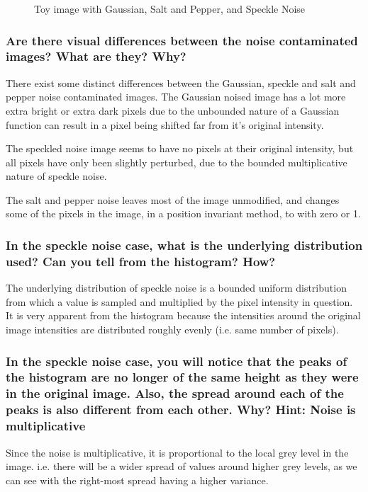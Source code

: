 \begin{figure}[htcb]
\centering
	\caption{Toy image with Gaussian, Salt and Pepper, and Speckle Noise}
	\label{fig:noiseGeneration.toy}
\end{figure}
 



\subsubsection{Are there visual differences between the noise contaminated images? What are they? Why?}
There exist some distinct differences between the Gaussian, speckle and salt and pepper noise contaminated images. The Gaussian noised image has a lot more extra bright or extra dark pixels due to the unbounded nature of a Gaussian function can result in a pixel being shifted far from it's original intensity.

The speckled noise image seems to have no pixels at their original intensity, but all pixels have only been slightly perturbed, due to the bounded multiplicative nature of speckle noise.

The salt and pepper noise leaves most of the image unmodified, and changes some of the pixels in the image, in a position invariant method, to with zero or 1.

\subsubsection{In the speckle noise case, what is the underlying distribution used? Can you tell from the histogram? How?}
The underlying distribution of speckle noise is a bounded uniform distribution from which a value is sampled and multiplied by the pixel intensity in question. It is very apparent from the histogram because the intensities around the original image intensities are distributed roughly evenly (i.e. same number of pixels).

\subsubsection{In the speckle noise case, you will notice that the peaks of the histogram are no longer of the same height as they were in the original image. Also, the spread around each of the peaks is also different from each other. Why? Hint: Noise is multiplicative}
Since the noise is multiplicative, it is proportional to the local grey level in the image. i.e. there will be a wider spread of values around higher grey levels, as we can see with the right-most spread having a higher variance.
